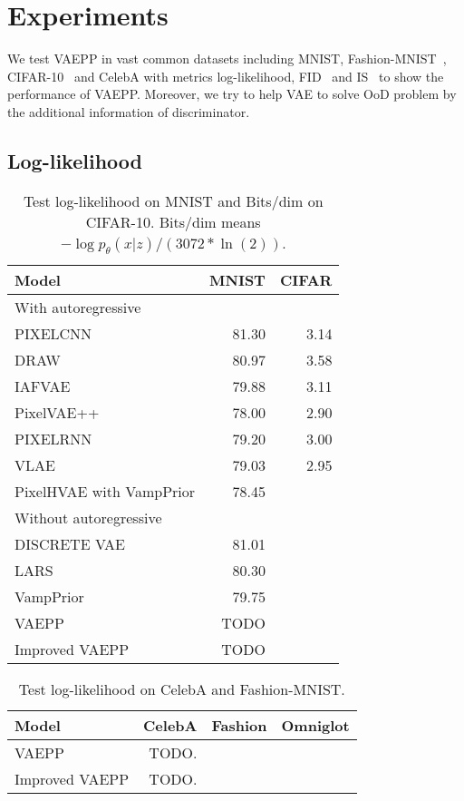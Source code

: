 \section{Experiments}
We test VAEPP in vast common datasets including MNIST, Fashion-MNIST~\cite{xiao2017/online}, CIFAR-10~\cite{krizhevsky2009learning} and CelebA with metrics log-likelihood, FID~\cite{heusel2017gans} and IS~\cite{salimans2016improved} to show the performance of VAEPP. Moreover, we try to help VAE to solve OoD problem by the additional information of discriminator. 
\subsection{Log-likelihood}
\begin{table}[tb]
\centering
\begin{tabular}{lrr}  
\toprule
Model  &  MNIST & CIFAR\\
\midrule
With autoregressive   \\
PIXELCNN         &  81.30  &  3.14   \\
DRAW             &  80.97  &  3.58    \\
IAFVAE           &  79.88  &  3.11    \\
PixelVAE++       &  78.00  &  2.90   \\
PIXELRNN         &  79.20  &  3.00    \\
VLAE             &  79.03  &  2.95     \\
PixelHVAE with VampPrior &  78.45  &     \\
\midrule
Without autoregressive   \\
DISCRETE VAE     &  81.01      \\
LARS             &  80.30     \\
VampPrior        &  79.75      \\
VAEPP            &  TODO      \\
Improved VAEPP   &  TODO      \\
\bottomrule
\end{tabular}
\caption{Test log-likelihood on MNIST and Bits/dim on CIFAR-10. Bits/dim means $-\log p_\theta(x|z) / (3072 * \ln(2))$.}
\label{tab:mnist-nll}
\end{table}
\begin{table}[tb]
\centering
\begin{tabular}{lrrr}  
\toprule
Model  &  CelebA & Fashion & Omniglot \\
\midrule
VAEPP           &  TODO.     \\
Improved VAEPP   &  TODO.     \\
\bottomrule
\end{tabular}
\caption{Test log-likelihood on CelebA and Fashion-MNIST. }
\label{tab:cifar-nll}
\end{table}
